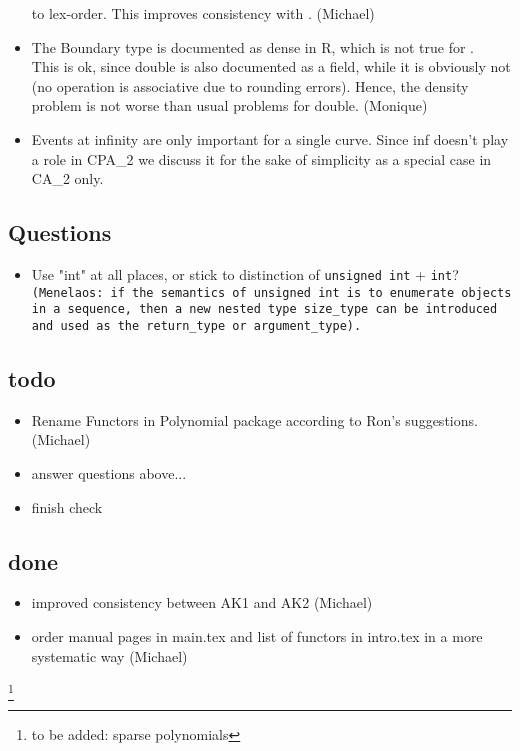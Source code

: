 \begin{itemize}
to lex-order. This improves consistency with . 
(Michael)
\item
The Boundary type is documented as dense in R, which is not true
for .\\ 
This is ok, since double is also documented as a
field, while it is obviously not (no operation is associative
due to rounding errors). Hence, the density problem is not worse
than usual problems for double. (Monique)
\item 
Events at infinity are only important for a single curve. Since
inf doesn't play a role in CPA\_2 we discuss it for the sake of
simplicity as a special case in CA\_2 only. 
\end{itemize}

\subsection{Questions}
\begin{itemize}
\item Use "int" at all places, or stick to distinction of \texttt{unsigned
   int} + \texttt{int}?\\
   \texttt{(Menelaos: if the semantics of \texttt{unsigned int} is to enumerate
   objects in a sequence, then a new nested type \texttt{size\_type}
   can be introduced and used as the \texttt{return\_type} or
   \texttt{argument\_type}).}
\end{itemize}

\subsection{todo} 
\begin{itemize}
\item 
Rename Functors in Polynomial package according to Ron's 
suggestions. (Michael)
\item {} answer questions above...
\item {} finish check 
\end{itemize} 

\subsection{done} 
\begin{itemize}
\item 
improved consistency between AK1 and AK2 (Michael)
\item 
order manual pages in main.tex and list of functors in intro.tex 
in a more systematic way (Michael)

\end{itemize}
\footnote{to be added: sparse polynomials}
